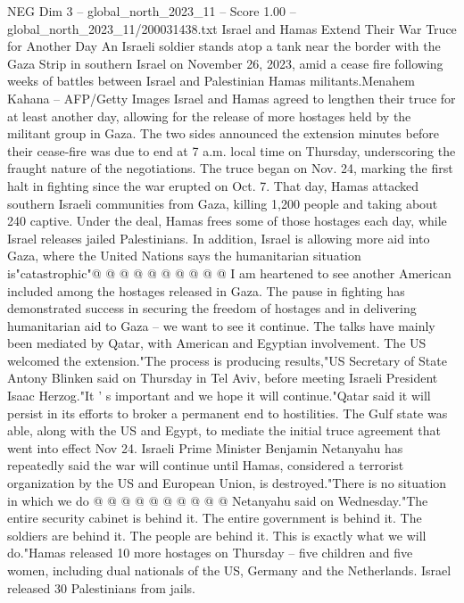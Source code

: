 \begin{textsample}{NEG Dim 3 – global\_north\_2023\_11 – Score 1.00 – global\_north\_2023\_11/200031438.txt}  \label{ex:f3_neg_277}
Israel and Hamas Extend Their War Truce for Another Day An Israeli soldier stands atop a tank near the border with the Gaza Strip in southern Israel on November 26, 2023, amid a cease fire following weeks of battles between Israel and Palestinian Hamas militants.Menahem Kahana -- AFP/Getty Images Israel and Hamas agreed to lengthen their truce for at least another day, allowing for the release of more hostages held by the militant group in Gaza.
The two sides announced the extension minutes before their cease-fire was due to end at 7 a.m. local time on Thursday, underscoring the fraught nature of the negotiations.
The truce began on Nov. 24, marking the first halt in fighting since the war erupted on Oct. 7.
That day, Hamas attacked southern Israeli communities from Gaza, killing 1,200 people and taking about 240 captive.
Under the deal, Hamas frees some of those hostages each day, while Israel releases jailed Palestinians.
In addition, Israel is allowing more aid into Gaza, where the United Nations says the humanitarian situation is"catastrophic"@ @ @ @ @ @ @ @ @ @ I am heartened to see another American included among the hostages released in Gaza.
The pause in fighting has demonstrated success in securing the freedom of hostages and in delivering humanitarian aid to Gaza -- we want to see it continue.
The talks have mainly been mediated by Qatar, with American and Egyptian involvement.
The US welcomed the extension."The process is producing results,"US Secretary of State Antony Blinken said on Thursday in Tel Aviv, before meeting Israeli President Isaac Herzog."It ' s important and we hope it will continue."Qatar said it will persist in its efforts to broker a permanent end to hostilities.
The Gulf state was able, along with the US and Egypt, to mediate the initial truce agreement that went into effect Nov 24.
Israeli Prime Minister Benjamin Netanyahu has repeatedly said the war will continue until Hamas, considered a terrorist organization by the US and European Union, is destroyed."There is no situation in which we do @ @ @ @ @ @ @ @ @ @ Netanyahu said on Wednesday."The entire security cabinet is behind it.
The entire government is behind it.
The soldiers are behind it.
The people are behind it.
This is exactly what we will do."Hamas released 10 more hostages on Thursday -- five children and five women, including dual nationals of the US, Germany and the Netherlands.
Israel released 30 Palestinians from jails.

\end{textsample}
